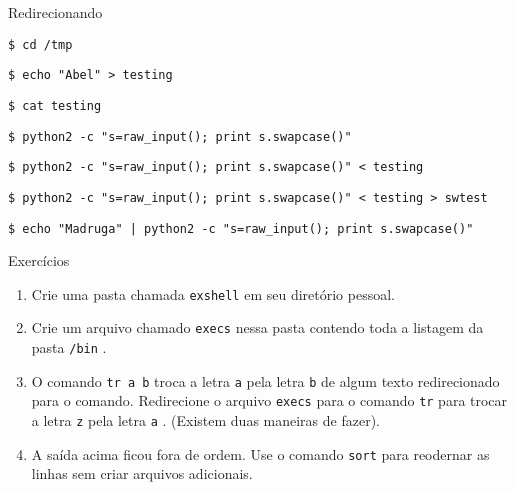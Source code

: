\documentclass[12pt]{article}
\newcommand{\aframe}[1]{
\Large
\begin{center}
#1
\end{center}
\vfill
\newpage
}
\newcommand{\tit}[1]{
{\LARGE \color{green} #1}
\\ \vspace{0.5cm}
\vfill
}
\newcommand{\cmd}[1]{
\begin{flushleft}
{\color{yellow} \tt \$ #1 }\\
\end{flushleft}
}
\newcommand{\cmdinline}[1]{
{\color{yellow} \tt #1} }
\begin{document}
\aframe{
\tit{Redirecionando}
\cmd{cd /tmp}
\cmd{echo "Abel" > testing}
\cmd{cat testing}
\cmd{python2 -c "s=raw\_input(); print s.swapcase()"}
\cmd{python2 -c "s=raw\_input(); print s.swapcase()" < testing}
\cmd{python2 -c "s=raw\_input(); print s.swapcase()" < testing > swtest}
\cmd{echo "Madruga" | python2 -c "s=raw\_input(); print s.swapcase()"}
}

\aframe{
\tit{Exercícios}
\begin{enumerate}
  \item Crie uma pasta chamada \cmdinline{exshell} em seu 
    diretório pessoal.
  \item Crie um arquivo chamado \cmdinline{execs} nessa pasta 
    contendo toda a listagem da pasta \cmdinline{/bin}.
  \item O comando \cmdinline{tr a b} troca a letra \cmdinline{a} pela
    letra \cmdinline{b} de algum texto redirecionado para o comando.
    Redirecione o arquivo \cmdinline{execs} para o comando \cmdinline{tr} para
    trocar a letra \cmdinline{z} pela letra \cmdinline{a}. (Existem duas
    maneiras de fazer).
  \item A saída acima ficou fora de ordem. Use o comando \cmdinline{sort} para
    reodernar as linhas sem criar arquivos adicionais.
\end{enumerate}
}
\end{document}
